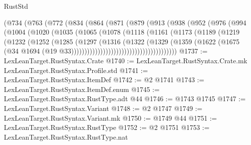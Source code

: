 \begin{lexlean}{RustStd}
\begin{coremodule}
                (@734
                  (@763
                    (@772
                      (@834
                        (@864
                          (@871
                            (@879
                              (@913
                                (@938
                                  (@952
                                    (@976
                                      (@994
                                        (@1004
                                          (@1020
                                            (@1035
                                              (@1065
                                                (@1078
                                                  (@1118
                                                    (@1161
                                                      (@1173
                                                        (@1189
                                                          (@1219
                                                            (@1232
                                                              (@1252
                                                                (@1285
                                                                  (@1297
                                                                    (@1316
                                                                      (@1322
                                                                        (@1329
                                                                          (@1359
                                                                            (@1622
                                                                              (@1675
                                                                                (@34
                                                                                  @1694
                                                                                  (@19
                                                                                    @33))))))))))))))))))))))))))))))))))))))))
@1737 := LexLeanTarget.RustSyntax.Crate
@1740 := LexLeanTarget.RustSyntax.Crate.mk LexLeanTarget.RustSyntax.Profile.std
@1741 := LexLeanTarget.RustSyntax.ItemDef
@1742 := @2 @1741
@1743 := LexLeanTarget.RustSyntax.ItemDef.enum
@1745 := LexLeanTarget.RustSyntax.RustType.adt @44
@1746 := @1743 @1745
@1747 := LexLeanTarget.RustSyntax.Variant
@1748 := @2 @1747
@1749 := LexLeanTarget.RustSyntax.Variant.mk
@1750 := @1749 @44
@1751 := LexLeanTarget.RustSyntax.RustType
@1752 := @2 @1751
@1753 := LexLeanTarget.RustSyntax.RustType.nat

\end{coremodule}
\end{lexlean}
